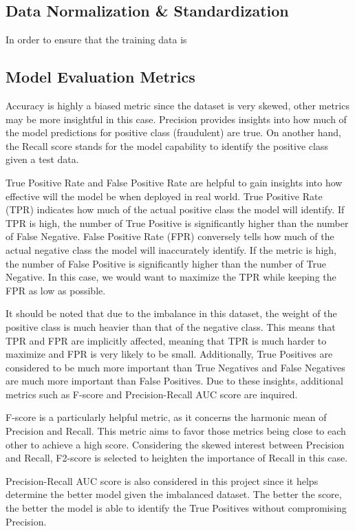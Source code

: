 \documentclass[12pt, letterpaper]{article}
\begin{document}
    \subsection{Data Normalization \& Standardization}
        In order to ensure that the training data is 

    \subsection{Model Evaluation Metrics}
        Accuracy is highly a biased metric since the dataset is very skewed, other metrics may be more insightful in this case. Precision provides insights into how much of the model predictions for positive class (fraudulent) are true. On another hand, the Recall score stands for the model capability to identify the positive class given a test data.

        True Positive Rate and False Positive Rate are helpful to gain insights into how effective will the model be when deployed in real world. True Positive Rate (TPR) indicates how much of the actual positive class the model will identify. If TPR is high, the number of True Positive is significantly higher than the number of False Negative. False Positive Rate (FPR) conversely tells how much of the actual negative class the model will inaccurately identify. If the metric is high, the number of False Positive is significantly higher than the number of True Negative. In this case, we would want to maximize the TPR while keeping the FPR as low as possible.

        It should be noted that due to the imbalance in this dataset, the weight of the positive class is much heavier than that of the negative class. This means that TPR and FPR are implicitly affected, meaning that TPR is much harder to maximize and FPR is very likely to be small. Additionally, True Positives are considered to be much more important than True Negatives and False Negatives are much more important than False Positives. Due to these insights, additional metrics such as F-score and Precision-Recall AUC score are inquired.

        F-score is a particularly helpful metric, as it concerns the harmonic mean of Precision and Recall. This metric aims to favor those metrics being close to each other to achieve a high score. Considering the skewed interest between Precision and Recall, F2-score is selected to heighten the importance of Recall in this case.

        Precision-Recall AUC score is also considered in this project since it helps determine the better model given the imbalanced dataset. The better the score, the better the model is able to identify the True Positives without compromising Precision.
\end{document}
